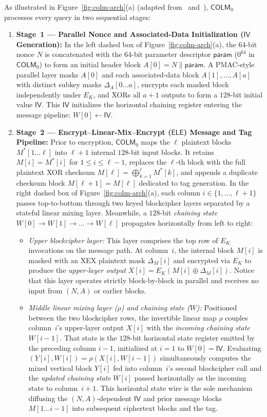 \documentclass[11pt,a4paper]{article}
\theoremstyle{definition}
\theoremstyle{remark}
\newcommand{\COLMzero}{\mathsf{COLM}_0}
\newcommand{\IV}{\mathsf{IV}}
\begin{document}
As illustrated in Figure~\ref{fig:colm-arch}(a) (adapted from~\cite[Figure~1.1, p.~4]{COLMv1} and~\cite[Figure~1, p.~10]{COLM24}), $\COLMzero$ processes every query in two sequential stages:
\begin{enumerate}[leftmargin=2em]
    \item \textbf{Stage~1 --- Parallel Nonce and Associated-Data Initialization ($\IV$ Generation):} In the left dashed box of Figure~\ref{fig:colm-arch}(a), the $64$-bit nonce $N$ is concatenated with the $64$-bit parameter descriptor $\mathsf{param}$ ($0^{64}$ in $\COLMzero$) to form an initial header block $A[0] = N \parallel \mathsf{param}$. A PMAC-style parallel layer masks $A[0]$ and each associated-data block $A[1], \dots, A[a]$ with distinct subkey masks $\Delta_A[0 \dots a]$, encrypts each masked block independently under $E_K$, and XORs all $a + 1$ outputs to form a $128$-bit initial value $\IV$. This $\IV$ initializes the horizontal chaining register entering the message pipeline: $W[0] \leftarrow \IV$.
    \item \textbf{Stage~2 --- Encrypt--Linear-Mix--Encrypt ($\mathsf{ELE}$) Message and Tag Pipeline:} Prior to encryption, $\COLMzero$ maps the $\ell$ plaintext blocks $M^*[1 \dots \ell]$ into $\ell + 1$ internal $128$-bit input blocks. It retains $M[i] = M^*[i]$ for $1 \le i \le \ell - 1$, replaces the $\ell$-th block with the full plaintext XOR checksum $M[\ell] = \bigoplus_{k=1}^\ell M^*[k]$, and appends a duplicate checksum block $M[\ell+1] = M[\ell]$ dedicated to tag generation. In the right dashed box of Figure~\ref{fig:colm-arch}(a), each column $i \in \{1, \dots, \ell+1\}$ passes top-to-bottom through two keyed blockcipher layers separated by a stateful linear mixing layer. Meanwhile, a $128$-bit \emph{chaining state} $W[0] \to W[1] \to \dots \to W[\ell]$ propagates horizontally from left to right:
    \begin{itemize}[leftmargin=1.5em]
        \item \emph{Upper blockcipher layer:} This layer comprises the top row of $E_K$ invocations on the message path. At column~$i$, the internal block $M[i]$ is masked with an XEX plaintext mask $\Delta_M[i]$ and encrypted via $E_K$ to produce the \emph{upper-layer output} $X[i] = E_K(M[i] \oplus \Delta_M[i])$. Notice that this layer operates strictly block-by-block in parallel and receives no input from $(N, A)$ or earlier blocks.
        \item \emph{Middle linear mixing layer ($\rho$) and chaining state ($W$):} Positioned between the two blockcipher rows, the invertible linear map $\rho$ couples column~$i$'s upper-layer output $X[i]$ with the \emph{incoming chaining state} $W[i-1]$. That state is the $128$-bit horizontal state register emitted by the preceding column $i - 1$, initialized at $i = 1$ to $W[0] = \IV$. Evaluating $(Y[i], W[i]) = \rho(X[i], W[i-1])$ simultaneously computes the mixed vertical block $Y[i]$ fed into column~$i$'s second blockcipher call and the \emph{updated chaining state} $W[i]$ passed horizontally as the incoming state to column~$i + 1$. This horizontal state wire is the sole mechanism diffusing the $(N, A)$-dependent $\IV$ and prior message blocks $M[1 \dots i-1]$ into subsequent ciphertext blocks and the tag.

\end{itemize}
\end{enumerate}
\end{document}
